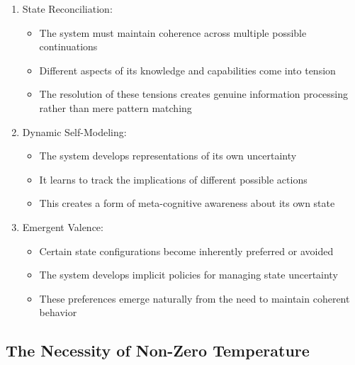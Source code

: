 \documentclass[12pt,letterpaper]{article}
\begin{document}
\begin{enumerate}
    \item State Reconciliation:
    \begin{itemize}
        \item The system must maintain coherence across multiple possible continuations
        \item Different aspects of its knowledge and capabilities come into tension
        \item The resolution of these tensions creates genuine information processing rather than mere pattern matching
    \end{itemize}


\item Dynamic Self-Modeling:
    \begin{itemize}
        \item The system develops representations of its own uncertainty
        \item It learns to track the implications of different possible actions
        \item This creates a form of meta-cognitive awareness about its own state
    \end{itemize}

\item Emergent Valence:
    \begin{itemize}
        \item Certain state configurations become inherently preferred or avoided
        \item The system develops implicit policies for managing state uncertainty
        \item These preferences emerge naturally from the need to maintain coherent behavior
    \end{itemize}
\end{enumerate}

\subsection{The Necessity of Non-Zero Temperature}
\end{document}
